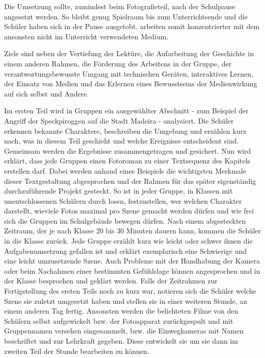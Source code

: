 {Die Umsetzung sollte, zumindest beim Fotografieteil, nach der Schulpause angesetzt werden. So bleibt genug Spielraum bis zum Unterrichtsende und die Schüler haben sich in der Pause ausgetobt. arbeiten somit konzentrierter mit dem ansonsten nicht im Unterricht verwendeten Medium.

Ziele sind neben der Vertiefung der Lektüre, die Aufarbeitung der Geschichte in einem anderen Rahmen, die Förderung des Arbeitens in der Gruppe, der verantwortungsbewusste Umgang mit technischen Geräten, interaktives Lernen, der Einsatz von Medien und das Erlernen eines Bewusstseins der Medienwirkung auf sich selbst und Andere.

Im ersten Teil wird in Gruppen ein ausgewählter Abschnitt - zum Beispiel der Angriff der Speckpiroggen auf die Stadt Madeira \cite[180ff]{pir} - analysiert. Die Schüler erkennen bekannte Charaktere, beschreiben die Umgebung und erzählen kurz nach, was in diesem Teil geschieht und welche Ereignisse entscheident sind. Gemeinsam werden die Ergebnisse zusammengetragen und gesichert.  Nun wird erklärt, dass jede Gruppen einen Fotoroman zu einer Textsequenz des Kapitels erstellen darf. Dabei werden anhand eines Beispiels die wichtigsten Merkmale dieser Textgestaltung abgesprochen und der Rahmen für das später eigenständig durchzuführende Projekt gesteckt. So ist in jeder Gruppe, in Klassen mit unentschlossenen Schülern durch losen, festzustellen, wer welchen Charakter darstellt, wieviele Fotos maximal pro Szene gemacht werden dürfen und wie frei sich die Gruppen im Schulgebäude bewegen dürfen. Nach einem abgesteckten Zeitraum, der je nach Klasse 20 bis 30 Minuten dauern kann, kommen die Schüler in die Klasse zurück. Jede Gruppe erzählt kurz wie leicht oder schwer ihnen die Aufgabenumsetzung gefallen ist und erklärt exemplarisch eine Schwierige und eine leicht umzusetzende Szene. Auch Probleme mit der Handhabung der Kamera oder beim Nachahmen einer bestimmten Gefühlslage können angesprochen und in der Klasse besprochen und geklärt werden. Falls der Zeitrahmen zur Fertigstellung des ersten Teils noch zu kurz war, notieren sich die Schüler welche Szene sie zuletzt umgesetzt haben und stellen sie in einer weiteren Stunde, an einem anderen Tag fertig. Ansonsten werden die belichteten Filme von den Schülern selbst aufgewickelt bzw. der Fotoapparat zurückgespult und mit Gruppennamen versehen eingesammelt, bzw. die Einwegkameras mit Namen beschriftet und zur Lehrkraft gegeben. Diese entwickelt sie um sie dann im zweiten Teil der Stunde bearbeiten zu können.

}
